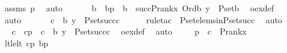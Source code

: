 \begin{isabellebody}
\ assms\ p{}\ \isamarkupfalse%
\ auto\ \isanewline
\ \ \isamarkupfalse%
\ \isamarkupfalse%
\ b\ \ bp\ {\isacharcolon}{\kern0pt}\ {\isachardoublequoteopen}b\ {\isacharless}{\kern0pt}\ succ{\isacharparenleft}{\kern0pt}P{\isacharunderscore}{\kern0pt}rank{\isacharparenleft}{\kern0pt}x{\isacharparenright}{\kern0pt}{\isacharparenright}{\kern0pt}{\isachardoublequoteclose}\ {\isachardoublequoteopen}Ord{\isacharparenleft}{\kern0pt}b{\isacharparenright}{\kern0pt}{\isachardoublequoteclose}\ {\isachardoublequoteopen}y\ {\isasymin}\ P{\isacharunderscore}{\kern0pt}set{\isacharparenleft}{\kern0pt}b{\isacharparenright}{\kern0pt}{\isachardoublequoteclose}\ \isamarkupfalse%
\ oex{\isacharunderscore}{\kern0pt}def\ \isamarkupfalse%
\ auto\ \isanewline
\ \ \isamarkupfalse%
\ \isamarkupfalse%
\ {\isachardoublequoteopen}{\isasymexists}c\ {\isacharless}{\kern0pt}\ b{\isachardot}{\kern0pt}\ y\ {\isasymin}\ P{\isacharunderscore}{\kern0pt}set{\isacharparenleft}{\kern0pt}succ{\isacharparenleft}{\kern0pt}c{\isacharparenright}{\kern0pt}{\isacharparenright}{\kern0pt}{\isachardoublequoteclose}\isanewline
\ \ \ \ \isamarkupfalse%
\ {\isacharparenleft}{\kern0pt}rule{\isacharunderscore}{\kern0pt}tac\ \ P{\isacharunderscore}{\kern0pt}set{\isacharunderscore}{\kern0pt}elems{\isacharunderscore}{\kern0pt}in{\isacharunderscore}{\kern0pt}P{\isacharunderscore}{\kern0pt}set{\isacharunderscore}{\kern0pt}succ{\isacharparenright}{\kern0pt}\ \isamarkupfalse%
\ auto\ \isanewline
\ \ \isamarkupfalse%
\ \isamarkupfalse%
\ c\ \ cp\ {\isacharcolon}{\kern0pt}\ {\isachardoublequoteopen}c\ {\isacharless}{\kern0pt}\ b{\isachardoublequoteclose}\ {\isachardoublequoteopen}y\ {\isasymin}\ P{\isacharunderscore}{\kern0pt}set{\isacharparenleft}{\kern0pt}succ{\isacharparenleft}{\kern0pt}c{\isacharparenright}{\kern0pt}{\isacharparenright}{\kern0pt}{\isachardoublequoteclose}\ \isamarkupfalse%
\ oex{\isacharunderscore}{\kern0pt}def\ \isamarkupfalse%
\ auto\ \isanewline
\ \ \isamarkupfalse%
\ p{}\ {\isacharcolon}{\kern0pt}\ {\isachardoublequoteopen}c\ {\isacharless}{\kern0pt}\ P{\isacharunderscore}{\kern0pt}rank{\isacharparenleft}{\kern0pt}x{\isacharparenright}{\kern0pt}{\isachardoublequoteclose}\ \isamarkupfalse%
\ lt{\isacharunderscore}{\kern0pt}le{\isacharunderscore}{\kern0pt}lt\ cp\ bp\ \isamarkupfalse%

\end{isabellebody}
